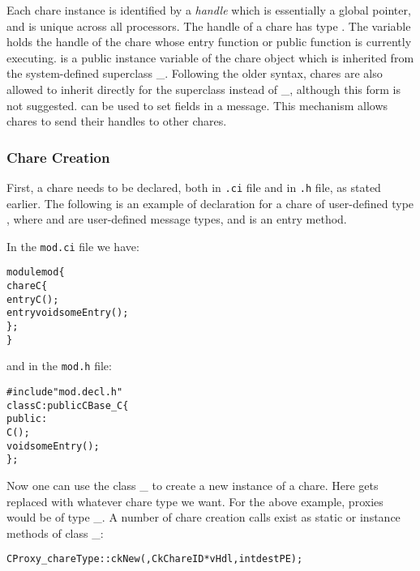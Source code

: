 Each chare instance is identified by a {\em handle} 
which is essentially a global pointer, and is unique across all
processors.  The handle of a chare has type .  The
variable  holds the handle of the
chare whose entry function or public function is currently executing.
 is a public instance variable of the chare object
which is inherited from the system-defined superclass
\_.
Following the older syntax, chares are also allowed to inherit directly
for the superclass  instead of \_, although
this form is not suggested.
 can be used to set fields in a message. This  
mechanism allows chares to send their handles to other chares.

\subsubsection{Chare Creation}

\label{chare creation}

First, a chare needs to be declared, both in \texttt{.ci} file and
in \texttt{.h} file, as stated earlier. The following is an example of
declaration for a chare of user-defined type , where 
and  are user-defined message types, and 
is an entry method.

In the \texttt{mod.ci} file we have:

\begin{alltt}
module mod \{
  chare C \{
    entry C();
    entry void someEntry();
  \};
\}
\end{alltt}

and in the \texttt{mod.h} file:

\begin{alltt}
#include "mod.decl.h"
class C : public CBase\_C \{
  public:
    C();
    void someEntry();
\};
\end{alltt}

Now one can use the class \_ to create a new instance
of a chare.  Here  gets replaced with whatever
chare type we want.  For the above example, proxies would be of
type \_. A number of chare creation calls exist
as static or instance methods of class \_:

\begin{alltt}
   CProxy_chareType::ckNew(, CkChareID *vHdl, int destPE);
\end{alltt}


